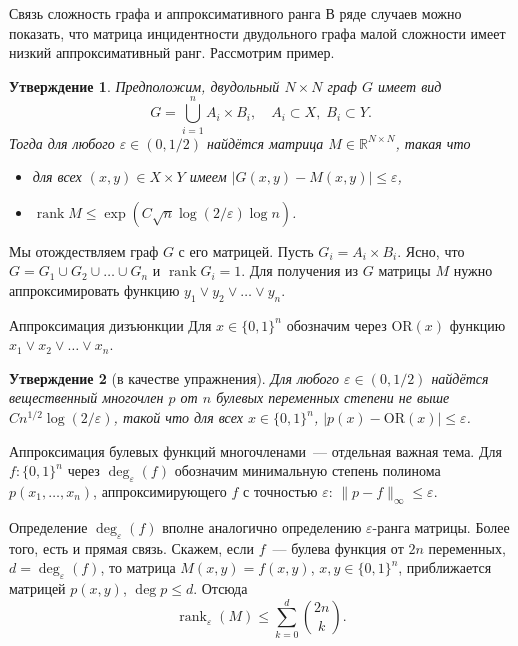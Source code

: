 \documentclass{beamer}
\renewcommand\le{\leqslant}
\newcommand\R{\mathbb R}
\newcommand\eps{\varepsilon}
\newtheorem*{statement}{Утверждение}
\DeclareMathOperator{\rank}{rank}
\begin{document}
\begin{frame}{Связь сложность графа и аппроксимативного ранга}
    В ряде случаев можно показать, что матрица инцидентности двудольного графа
    малой сложности имеет низкий аппроксимативный ранг. Рассмотрим пример.
    \pause

    \begin{statement}
        Предположим, двудольный $N\times N$ граф $G$ имеет вид
        $$
        G = \bigcup_{i=1}^n A_i\times B_i,\quad A_i\subset X,\;B_i\subset Y.
        $$
        Тогда для любого $\eps\in(0,1/2)$ найдётся матрица $M\in\R^{N\times N}$, такая что
        \begin{itemize}
            \item для всех $(x,y)\in X\times Y$ имеем $|G(x,y)-M(x,y)|\le\eps$,
            \item $\rank M\le \exp(C\sqrt{n}\log(2/\eps)\log n)$.
        \end{itemize}
    \end{statement}
    \pause\vspace{5pt}

    Мы отождествляем граф $G$ с его матрицей. Пусть $G_i=A_i\times B_i$.
    Ясно, что $G=G_1\cup G_2\cup\ldots\cup G_n$ и $\rank G_i=1$. Для получения
    из $G$ матрицы $M$ нужно аппроксимировать функцию $y_1\vee y_2\vee\ldots\vee
    y_n$.
\end{frame}
\begin{frame}{Аппроксимация дизъюнкции}
    Для $x\in \{0,1\}^n$ обозначим через $\mathrm{OR}(x)$ функцию $x_1\vee
    x_2\vee\ldots\vee x_n$.
    \begin{statement}[в качестве упражнения]
        Для любого $\eps\in(0,1/2)$ найдётся вещественный многочлен $p$ от $n$
        булевых переменных степени не выше $C n^{1/2}\log(2/\eps)$, такой что
        для всех $x\in\{0,1\}^n$, $|p(x)-\mathrm{OR}(x)|\le \eps$.
    \end{statement}

    Аппроксимация булевых функций многочленами~--- отдельная важная
    тема. Для $f\colon\{0,1\}^n$ через $\deg_\eps(f)$ обозначим минимальную
    степень полинома $p(x_1,\ldots,x_n)$, аппроксимирующего $f$ с точностью
    $\eps$: $\|p-f\|_\infty\le \eps$.
    \pause

    Определение $\deg_\eps(f)$ вполне аналогично определению $\eps$-ранга
    матрицы. Более того, есть и прямая связь. Скажем, если $f$~--- булева
    функция от $2n$ переменных, $d=\deg_\eps(f)$, то матрица $M(x,y)=f(x,y)$,
    $x,y\in\{0,1\}^n$, приближается матрицей $p(x,y)$, $\deg p\le d$. Отсюда
    $$
    \rank_\eps(M) \le \sum_{k=0}^d\binom{2n}{k}.
    $$
\end{frame}
\end{document}
